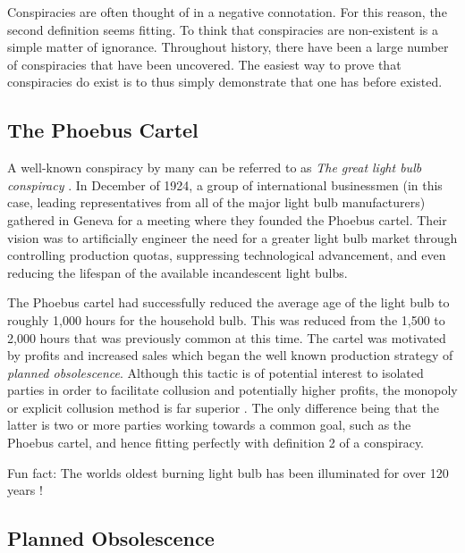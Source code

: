 \documentclass[10pt, a4paper, twocolumn]{book}
\begin{document}
Conspiracies are often thought of in a negative connotation. For this reason, the second definition seems fitting. To think that conspiracies are non-existent is a simple matter of ignorance. Throughout history, there have been a large number of conspiracies that have been uncovered. The easiest way to prove that conspiracies do exist is to thus simply demonstrate that one has before existed. 

\subsection{The Phoebus Cartel}

A well-known conspiracy by many can be referred to as \textit{The great light bulb conspiracy} \citep{IEEELightbulbConspiracy}. In December of 1924, a group of international businessmen (in this case, leading representatives from all of the major light bulb manufacturers) gathered in Geneva for a meeting where they founded the Phoebus cartel. Their vision was to artificially engineer the need for a greater light bulb market through controlling production quotas, suppressing technological advancement, and even reducing the lifespan of the available incandescent light bulbs.

The Phoebus cartel had successfully reduced the average age of the light bulb to roughly 1,000 hours for the household bulb. This was reduced from the 1,500 to 2,000 hours that was previously common at this time. The cartel was motivated by profits and increased sales which began the well known production strategy of \textit{planned obsolescence}. Although this tactic is of potential interest to isolated parties in order to facilitate collusion and potentially higher profits, the monopoly or explicit collusion method is far superior \citep{Strausz2008Collusion}. The only difference being that the latter is two or more parties working towards a common goal, such as the Phoebus cartel, and hence fitting perfectly with definition 2 of a conspiracy.

\begin{formal}
	Fun fact: The worlds oldest burning light bulb has been illuminated for over 120 years \citep{LightingTechnology,centennialLight}!
\end{formal}

\subsection{Planned Obsolescence}
\end{document}
